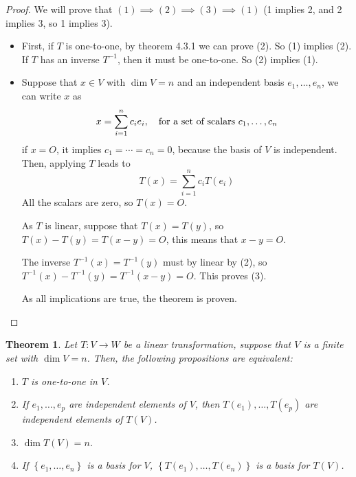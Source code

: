 \documentclass{book}
\newtheorem{theorem}{Theorem}[section]
\begin{document}
\begin{proof}
    We will prove that $(1)\implies (2) \implies (3) \implies (1)$ (1 implies 2, and 2 implies 3, so 1 implies 3).

    \begin{itemize}
        \item First, if $T$ is one-to-one, by theorem 4.3.1 we can prove (2). So (1) implies
              (2). If $T$ has an inverse $T^{-1}$, then it must be one-to-one. So (2) implies
              (1).
        \item Suppose that $x\in V$ with $\dim V = n$ and an independent basis
              $e_1,\dots,e_n$, we can write $x$ as
              \begin{equation*}
                  x=\sum_{i=1}^{n}{c_i e_i}, \quad \textnormal{for a set of scalars }c_1,\dots,c_n
              \end{equation*}
              if $x=O$, it implies $c_1=\cdots=c_n=0$, because the basis of $V$ is independent. Then, applying $T$ leads to
              \begin{equation*}
                  T(x)=\sum_{i=1}^{n}{c_i T(e_i)}
              \end{equation*}
              All the scalars are zero, so $T(x) = O$.

              As $T$ is linear, suppose that $T(x) = T(y)$, so $T(x) - T(y)= T(x-y) = O$,
              this means that $x-y=O$.

              The inverse $T^{-1}(x) = T^{-1}(y)$ must by linear by (2), so $T^{-1}(x) -
                  T^{-1}(y) = T^{-1}(x-y)=O$. This proves (3).

              As all implications are true, the theorem is proven.
    \end{itemize}
\end{proof}

\begin{theorem}
    Let $T: V\to W$ be a linear transformation, suppose that $V$ is a finite set with $\dim V = n$.
    Then, the following propositions are equivalent:

    \begin{enumerate}
        \item $T$ is one-to-one in $V$.
        \item If $e_1,\dots,e_p$ are independent elements of $V$, then $T(e_1),\dots, T(e_p)$
              are independent elements of $T(V)$.
        \item $\dim T(V) = n$.
        \item If $\left\{e_1,\dots, e_n\right\}$ is a basis for $V$, $\left\{T(e_1),\dots,
                  T(e_n)\right\}$ is a basis for $T(V)$.
    \end{enumerate}

\end{theorem}
\end{document}

